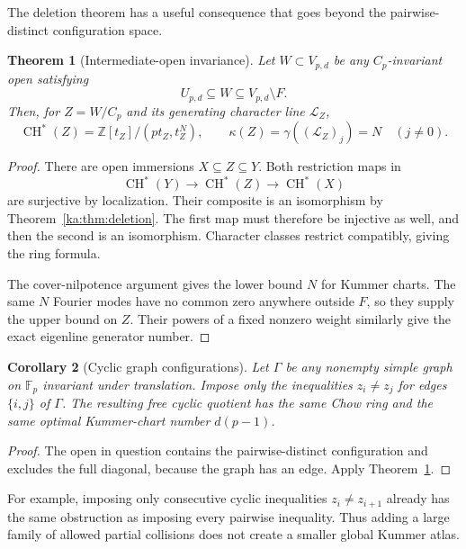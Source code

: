 \documentclass[11pt,a4paper]{article}
\newtheorem{theorem}{Theorem}[section]
\newtheorem{corollary}[theorem]{Corollary}
\theoremstyle{definition}
\theoremstyle{remark}
\newcommand{\Z}{\mathbb Z}
\newcommand{\F}{\mathbb F}
\newcommand{\LL}{\mathcal L}
\newcommand{\CH}{\operatorname{CH}}
\newcommand{\atlas}{\kappa}
\newcommand{\gen}{\gamma}
\begin{document}
The deletion theorem has a useful consequence that goes beyond the
pairwise-distinct configuration space.

\begin{theorem}[Intermediate-open invariance]
\label{ka:thm:sandwich}
Let $W\subset V_{p,d}$ be any $C_p$-invariant open satisfying
\begin{equation}
 U_{p,d}\subseteq W\subseteq V_{p,d}\setminus F.
 \label{ka:eq:sandwich}
\end{equation}
Then, for $Z=W/C_p$ and its generating character line $\LL_Z$,
\begin{equation}
 \CH^*(Z)=\Z[t_Z]/(pt_Z,t_Z^N),\qquad
 \atlas(Z)=\gen((\LL_Z)_j)=N\quad(j\neq0).
 \label{ka:eq:sandwichconclusions}
\end{equation}
\end{theorem}
\begin{proof}
There are open immersions $X\subseteq Z\subseteq Y$. Both restriction
maps in
\[
 \CH^*(Y)\longrightarrow\CH^*(Z)\longrightarrow\CH^*(X)
\]
are surjective by localization. Their composite is an isomorphism by
Theorem~\ref{ka:thm:deletion}. The first map must therefore be injective
as well, and then the second is an isomorphism. Character classes
restrict compatibly, giving the ring formula.

The cover-nilpotence argument gives the lower bound $N$ for Kummer
charts. The same $N$ Fourier modes have no common zero anywhere outside
$F$, so they supply the upper bound on $Z$. Their powers of a fixed
nonzero weight similarly give the exact eigenline generator number.
\end{proof}

\begin{corollary}[Cyclic graph configurations]
\label{ka:cor:graphs}
Let $\Gamma$ be any nonempty simple graph on $\F_p$ invariant under
translation. Impose only the inequalities $z_i\neq z_j$ for edges
$\{i,j\}$ of $\Gamma$. The resulting free cyclic quotient has the same
Chow ring and the same optimal Kummer-chart number $d(p-1)$.
\end{corollary}
\begin{proof}
The open in question contains the pairwise-distinct configuration and
excludes the full diagonal, because the graph has an edge. Apply
Theorem~\ref{ka:thm:sandwich}.
\end{proof}

For example, imposing only consecutive cyclic inequalities
$z_i\neq z_{i+1}$ already has the same obstruction as imposing every
pairwise inequality. Thus adding a large family of allowed partial
collisions does not create a smaller global Kummer atlas.
\end{document}
